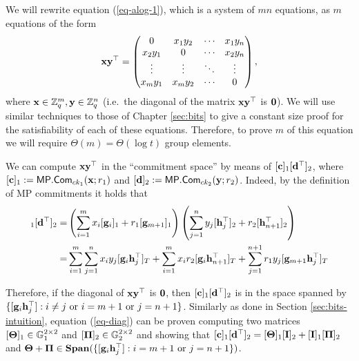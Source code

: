 We will rewrite equation (\ref{eq-alog-1}), which is a system of $m n$ equations, as $m$ equations of the form
\begin{equation}
\mathbf{x}\mathbf{y}^\top=\left(\begin{matrix}
    0      & x_1y_2 & \cdots & x_1y_n\\
    x_2y_1 & 0      & \cdots & x_2y_n\\
    \vdots & \vdots & \ddots & \vdots\\
    x_my_1 & x_my_2 & \cdots & 0\end{matrix}\right),
\label{eq-diag}
\end{equation}
where $\mathbf{x}\in\mathbb{Z}_q^m,\mathbf{y}\in\mathbb{Z}_q^n$ (i.e.~the diagonal of the matrix $\mathbf{x}\mathbf{y}^\top$ is $\mathbf{0}$). We will use similar techniques to those of Chapter \ref{sec:bits} to give a constant size proof for the satisfiability of each of these equations. Therefore, to prove $m$ of this equation we will require $\Theta(m)=\Theta(\log t)$ group elements.

We can compute $\mathbf{x}\mathbf{y}^\top$ in the ``commitment space'' by means of $[\mathbf{c}]_1[\mathbf{d}^\top]_2$, where $[\mathbf{c}]_1:=\mathsf{MP}.\mathsf{Com}_{ck_1}(\mathbf{x};r_1)$ and $[\mathbf{d}]_2:=\mathsf{MP}.\mathsf{Com}_{ck_2}(\mathbf{y};r_2)$. Indeed, by the definition of MP commitments it holds that
\begin{align}
[\vecb{c}]_1[\vecb{d}^\top]_2
=&\left(\sum_{i=1}^{m}x_i[\vecb{g}_i]_1+r_1[\vecb{g}_{m+1}]_1\right)\left(\sum_{j=1}^{n}y_j[\vecb{h}_j^\top]_2+r_2[\vecb{h}_{n+1}^\top]_2\right)\\
=&\sum_{i=1}^m\sum_{j=1}^n x_iy_j[\vecb{g}_i\vecb{h}_j^\top]_T+\sum_{i=1}^{m}x_ir_2[\vecb{g}_i\vecb{h}_{n+1}^\top]_T+\sum_{j=1}^{n+1}r_1y_j[\vecb{g}_{m+1}\vecb{h}_j^\top]_T
\end{align}

Therefore, if the diagonal of $\mathbf{x}\mathbf{y}^\top$ is $\mathbf{0}$, then $[\mathbf{c}]_1[\mathbf{d}^\top]_2$ is in the space spanned by $\{[\mathbf{g}_i\mathbf{h}_j^\top]:i\neq j \text{ or }i=m+1\text{ or } j=n+1\}$. Similarly as done in Section \ref{sec:bits-intuition}, equation (\ref{eq-diag}) can be proven computing two matrices $[\mathbf{{\Theta}}]_1\in\mathbb{G}_1^{2\times2}$ and $[\mathbf{{\Pi}}]_2\in\mathbb{G}_2^{2\times 2}$ and showing that $[\mathbf{c}]_1[\mathbf{d}^\top]_2=[\mathbf{{\Theta}}]_1[\mathbf{{I}}]_2+[\mathbf{{I}}]_1[\mathbf{{\Pi}}]_2$ and $\mathbf{{\Theta}}+\mathbf{{\Pi}}\in\mathbf{Span}(\{[\mathbf{g}_i\mathbf{h}_j^\top]:i=m+1\text{ or }j=n+1\})$.

